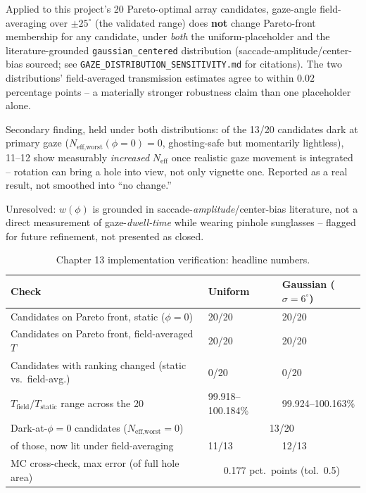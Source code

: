\documentclass[11pt]{report}
\begin{document}
Applied to this project's 20 Pareto-optimal array candidates, gaze-angle field-averaging
over $\pm25^\circ$ (the validated range) does \textbf{not} change Pareto-front membership
for any candidate, under \emph{both} the uniform-placeholder and the
literature-grounded \texttt{gaussian\_centered} distribution (saccade-amplitude/center-bias
sourced; see \texttt{GAZE\_DISTRIBUTION\_SENSITIVITY.md} for citations). The two
distributions' field-averaged transmission estimates agree to within $0.02$ percentage
points -- a materially stronger robustness claim than one placeholder alone.

Secondary finding, held under both distributions: of the 13/20 candidates dark at primary
gaze ($N_{\text{eff,worst}}(\phi{=}0)=0$, ghosting-safe but momentarily lightless), 11--12
show measurably \emph{increased} $N_{\text{eff}}$ once realistic gaze movement is
integrated -- rotation can bring a hole into view, not only vignette one. Reported as a
real result, not smoothed into ``no change.''

Unresolved: $w(\phi)$ is grounded in saccade-\emph{amplitude}/center-bias literature, not
a direct measurement of gaze-\emph{dwell-time} while wearing pinhole sunglasses -- flagged
for future refinement, not presented as closed.

\begin{table}[h!]
\centering\small
\caption{Chapter 13 implementation verification: headline numbers.}
\begin{tabular}{p{7.7cm}p{2.3cm}p{2.3cm}}
\toprule
\textbf{Check} & \textbf{Uniform} & \textbf{Gaussian ($\sigma{=}6^\circ$)} \\
\midrule
Candidates on Pareto front, static ($\phi{=}0$) & 20/20 & 20/20 \\
Candidates on Pareto front, field-averaged $T$ & 20/20 & 20/20 \\
Candidates with ranking changed (static vs.\ field-avg.) & 0/20 & 0/20 \\
$T_{\text{field}}/T_{\text{static}}$ range across the 20 & 99.918--100.184\% & 99.924--100.163\% \\
Dark-at-$\phi{=}0$ candidates ($N_{\text{eff,worst}}=0$) & \multicolumn{2}{c}{13/20} \\
\quad of those, now lit under field-averaging & 11/13 & 12/13 \\
MC cross-check, max error (of full hole area) & \multicolumn{2}{c}{0.177 pct.\ points (tol.\ 0.5)} \\
\bottomrule
\end{tabular}
\end{table}
\end{document}
